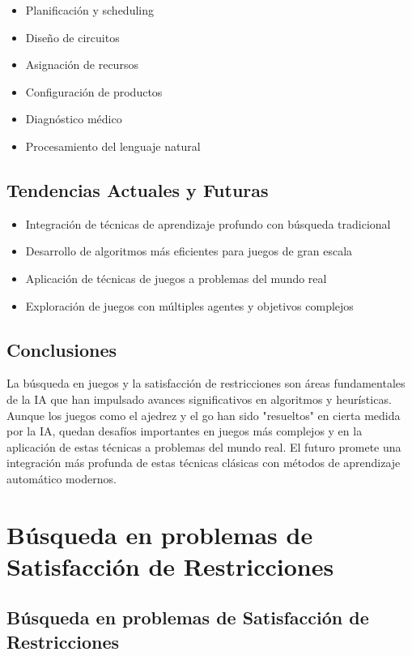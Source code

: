 \documentclass[12pt,a4paper]{report}
\begin{document}
	\begin{itemize}
		\item Planificación y scheduling
		\item Diseño de circuitos
		\item Asignación de recursos
		\item Configuración de productos
		\item Diagnóstico médico
		\item Procesamiento del lenguaje natural
	\end{itemize}
	
	\section{Tendencias Actuales y Futuras}
	
	\begin{itemize}
		\item Integración de técnicas de aprendizaje profundo con búsqueda tradicional
		\item Desarrollo de algoritmos más eficientes para juegos de gran escala
		\item Aplicación de técnicas de juegos a problemas del mundo real
		\item Exploración de juegos con múltiples agentes y objetivos complejos
	\end{itemize}
	
	\section{Conclusiones}
	
	La búsqueda en juegos y la satisfacción de restricciones son áreas fundamentales de la IA que han impulsado avances significativos en algoritmos y heurísticas. Aunque los juegos como el ajedrez y el go han sido "resueltos" en cierta medida por la IA, quedan desafíos importantes en juegos más complejos y en la aplicación de estas técnicas a problemas del mundo real. El futuro promete una integración más profunda de estas técnicas clásicas con métodos de aprendizaje automático modernos.

 \chapter{Búsqueda en problemas de Satisfacción de Restricciones}
\section{Búsqueda en problemas de Satisfacción de Restricciones}
\end{document}
